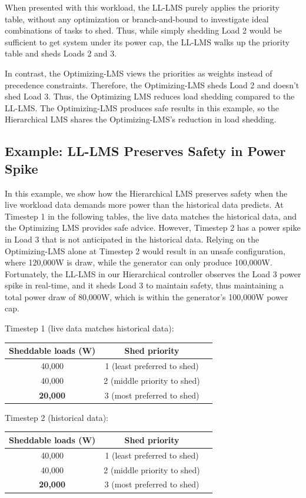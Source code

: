 \documentclass{acm_proc_article-sp}
\begin{document}
When presented with this workload, the LL-LMS purely applies the priority table, without any optimization or branch-and-bound to investigate ideal combinations of tasks to shed. 
Thus, while simply shedding Load 2 would be sufficient to get system under its power cap, the LL-LMS walks up the priority table and sheds Loads 2 and 3.

In contrast, the Optimizing-LMS views the priorities as weights instead of precedence constraints. 
Therefore, the Optimizing-LMS sheds Load 2 and doesn't shed Load 3. 
Thus, the Optimizing LMS reduces load shedding compared to the LL-LMS.
The Optimizing-LMS produces safe results in this example, so the Hierarchical LMS shares the Optimizing-LMS's reduction in load shedding.

\subsection{Example: LL-LMS Preserves Safety in Power Spike}
In this example, we show how the Hierarchical LMS preserves safety when the live workload data demands more power than the historical data predicts. 
At Timestep 1 in the following tables, the live data matches the historical data, and the Optimizing LMS provides safe advice.
However, Timestep 2 has a power spike in Load 3 that is not anticipated in the historical data. 
Relying on the Optimizing-LMS alone at Timestep 2 would result in an unsafe configuration, where 120,000W is draw, while the generator can only produce 100,000W.
Fortunately, the LL-LMS in our Hierarchical controller observes the Load 3 power spike in real-time, and it sheds Load 3 to maintain safety, thus maintaining a total power draw of 80,000W, which is within the generator's 100,000W power cap.

Timestep 1 (live data matches historical data):\\
\begin{tabular}{c|cc}
Sheddable loads (W) & Shed priority \\ \hline
40,000 & 1 (least preferred to shed) \\
40,000 & 2 (middle priority to shed) \\ 
{\bf 20,000} & 3 (most preferred to shed) \\ \hline
\end{tabular}

Timestep 2 (historical data): \\
\begin{tabular}{c|cc}
Sheddable loads (W) & Shed priority \\ \hline
40,000 & 1 (least preferred to shed) \\
40,000 & 2 (middle priority to shed) \\ 
{\bf 20,000} & 3 (most preferred to shed) \\ \hline
\end{tabular}
\end{document}
